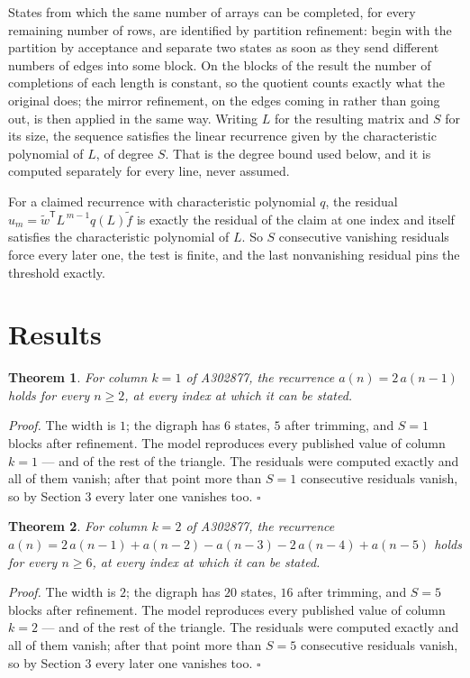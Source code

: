 \documentclass[11pt]{article}
\newtheorem{theorem}{Theorem}
\theoremstyle{definition}
\begin{document}
States from which the same number of arrays can be completed, for every remaining number of rows, are identified by partition refinement: begin with the partition by acceptance and separate two states as soon as they send different numbers of edges into some block. On the blocks of the result the number of completions of each length is constant, so the quotient counts exactly what the original does; the mirror refinement, on the edges coming in rather than going out, is then applied in the same way. Writing $L$ for the resulting matrix and $S$ for its size, the sequence satisfies the linear recurrence given by the characteristic polynomial of $L$, of degree $S$. That is the degree bound used below, and it is computed separately for every line, never assumed.

For a claimed recurrence with characteristic polynomial $q$, the residual $u_m = \tilde w^{\mathsf T}L^{\,m-1}q(L)\tilde f$ is exactly the residual of the claim at one index and itself satisfies the characteristic polynomial of $L$. So $S$ consecutive vanishing residuals force every later one, the test is finite, and the last nonvanishing residual pins the threshold exactly.

\section{Results}

\begin{theorem} For column $k = 1$ of A302877, the recurrence $a(n) = 2\,a(n-1)$ holds for every $n \ge 2$, at every index at which it can be stated.\end{theorem}

{\itshape Proof.} The width is $1$; the digraph has $6$ states, $5$ after trimming, and $S = 1$ blocks after refinement. The model reproduces every published value of column $k = 1$ --- and of the rest of the triangle. The residuals were computed exactly and all of them vanish; after that point more than $S = 1$ consecutive residuals vanish, so by Section 3 every later one vanishes too. $\square$

\begin{theorem} For column $k = 2$ of A302877, the recurrence $a(n) = 2\,a(n-1) + a(n-2) - a(n-3) - 2\,a(n-4) + a(n-5)$ holds for every $n \ge 6$, at every index at which it can be stated.\end{theorem}

{\itshape Proof.} The width is $2$; the digraph has $20$ states, $16$ after trimming, and $S = 5$ blocks after refinement. The model reproduces every published value of column $k = 2$ --- and of the rest of the triangle. The residuals were computed exactly and all of them vanish; after that point more than $S = 5$ consecutive residuals vanish, so by Section 3 every later one vanishes too. $\square$
\end{document}
